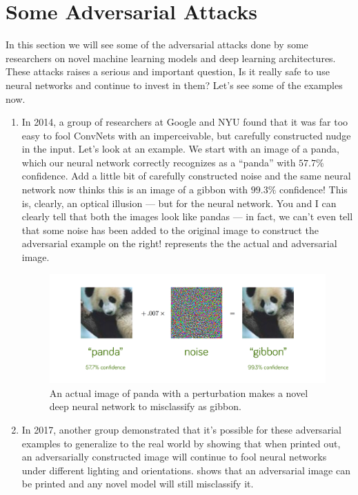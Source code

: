 \section{Some Adversarial Attacks}		
	In this section we will see some of the adversarial attacks done by some researchers on novel machine learning models and deep learning architectures. These attacks raises a serious and important question, Is it really safe to use neural networks and continue to invest in them? Let's see some of the examples now.
	
	\begin{enumerate}
        \item  In 2014, a group of researchers at Google and NYU found that it was far too easy to fool ConvNets with an imperceivable, but carefully constructed nudge in the input. Let’s look at an example. We start with an image of a panda, which our neural network correctly recognizes as a “panda” with $57.7 \%$ confidence. Add a little bit of carefully constructed noise and the same neural network now thinks this is an image of a gibbon with $99.3 \%$ confidence! This is, clearly, an optical illusion — but for the neural network. You and I can clearly tell that both the images look like pandas — in fact, we can’t even tell that some noise has been added to the original image to construct the adversarial example on the right!  represents the the actual and adversarial image.
            \begin{figure}[htbp]
                \centering
                    \includegraphics[width=0.8\linewidth]{images/panda_attack.png}
                \caption{An actual image of panda with a perturbation makes a novel deep neural network to misclassify as gibbon.}
                \label{fig:panda_attack}
            \end{figure}

        \item In 2017, another group demonstrated that it’s possible for these adversarial examples to generalize to the real world by showing that when printed out, an adversarially constructed image will continue to fool neural networks under different lighting and orientations.  shows that an adversarial image  can be printed and any novel model will still misclassify it.
        

\end{enumerate}
